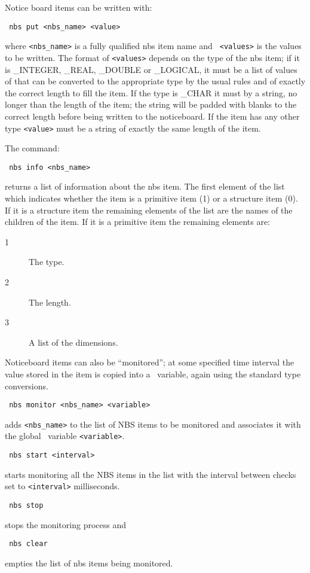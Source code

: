 Notice board items can be written with:
\begin{tquote}{\tt
nbs put <nbs\_name> <value>
}\end{tquote}
where {\tt <nbs\_name>} is a fully qualified nbs item name and {\tt
<values>} is the values to be written.
The format of {\tt <values>} depends on the type of the nbs item; if it
is \_INTEGER, \_REAL, \_DOUBLE or \_LOGICAL, it must be a list of values of
that can be converted to the appropriate type by the usual rules and of
exactly the correct length to fill the item. If the type is \_CHAR it must
by a string, no longer than the length of the item; the string will be padded
with blanks to the correct length before being written to the noticeboard. If
the item has any other type {\tt <value>} must be a string of exactly the same
length of the item.

The command:
\begin{tquote}{\tt
nbs info <nbs\_name>
}\end{tquote}
returns a list of information about the nbs item. The first element of the list
which indicates whether the item is a primitive item (1) or a structure item
(0). If it is a structure item the remaining elements of the list are the names
of the children of the item. If it is a primitive item the remaining elements
are:
\begin{description}
\item[1] The type.
\item[2] The length.
\item[3] A list of the dimensions.
\end{description}

Noticeboard items can also be ``monitored''; at some specified time
interval the
value stored in the item is copied into a \Tcl\ variable, again using the
standard type conversions.
\begin{tquote}{\tt
nbs monitor <nbs\_name> <variable>
}\end{tquote}
adds {\tt <nbs\_name>} to the list of NBS items to be monitored and
associates it with the global \Tcl\ variable {\tt <variable>}.
\begin{tquote}{\tt
nbs start <interval>
}\end{tquote}
starts monitoring all the NBS items in the list with the interval between
checks set to {\tt <interval>} milliseconds.

\begin{tquote}{\tt
nbs stop
}\end{tquote}
stops the monitoring process and
\begin{tquote}{\tt
nbs clear
}\end{tquote}
empties the list of nbs items being monitored.


